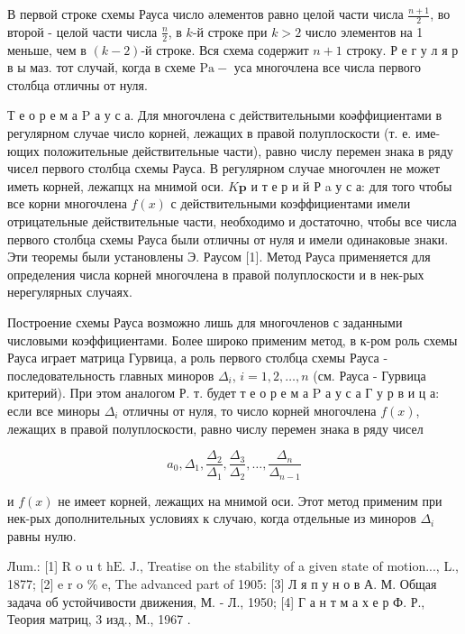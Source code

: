 \documentclass[10pt]{article}
\begin{document}
В первой строке схемы Рауса число әлементов равно целой части числа $\frac{n+1}{2}$, во второй - целой части числа $\frac{n}{2}$, в $k$-й строке при $k>2$ число элементов на 1 меньше, чем в $(k-2)$-й строке. Вся схема содержит $n+1$ строку. Р е г у л я р в ы маз. тот случай, когда в схеме $\mathrm{Pa}-$ уса многочлена все числа первого столбца отличны от нуля.



Т е о р е м а P а у с а. Для многочлена с действительными коәффициентами в регулярном случае число корней, лежащих в правой полуплоскости (т. е. име- ющих положительные действительные части), равно числу перемен знака в ряду чисел первого столбца схемы Рауса. В регулярном случае многочлен не может иметь корней, лежапцх на мнимой оси. $K \mathbf{p}$ и т е р и й Р a у с а: для того чтобы все корни многочлена $f(x)$ с действительными коэффициентами имели отрицательные действительные части, необходимо и достаточно, чтобы все числа первого столбца схемы Рауса были отличны от нуля и имели одинаковые знаки. Эти теоремы были установлены Э. Раусом [1]. Метод Рауса применяется для определения числа корней многочлена в правой полуплоскости и в нек-рых нерегулярных случаях.



Построение схемы Рауса возможно лишь для многочленов с заданными числовыми коэффициентами. Более широко применим метод, в к-ром роль схемы Рауса играет матрица Гурвица, а роль первого столбца схемы Рауса - последовательность главных миноров $\Delta_{i}$, $i=1,2, \ldots, n$ (см. Рауса - Гурвица критерий). При этом аналогом Р. т. будет т е о р е м а $\mathrm{P}$ а у с а Г у р в и ц а: если все миноры $\Delta_{i}$ отличны от нуля, то число корней многочлена $f(x)$, лежащих в правой полуплоскости, равно числу перемен знака в ряду чисел



\[

a_{0}, \Delta_{1}, \frac{\Delta_{2}}{\Delta_{1}}, \frac{\Delta_{3}}{\Delta_{2}}, \ldots, \frac{\Delta_{n}}{\Delta_{n-1}}

\]



и $f(x)$ не имеет корней, лежащих на мнимой оси. Этот метод применим при нек-рых дополнительных условиях к случаю, когда отдельные из миноров $\Delta_{i}$ равны нулю.



Лum.: [1] R o u t $\mathrm{h} \mathrm{E}$. J., Treatise on the stability of a given state of motion..., L., 1877; [2] e $\mathrm{r}$ o \% e, The advanced part of 1905: [3] Л я п у н о в А. М. Общая задача об устойчивости движения, М. - Л., 1950; [4] Г а н т м а х е р Ф. Р., Теория матриц, 3 изд., М., 1967 .
\end{document}
